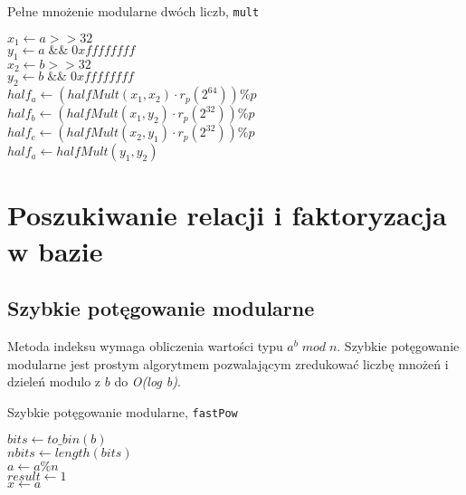 \documentclass[]{article}
\begin{document}
	\begin{algorithm}[H]
		\SetAlgoLined
		\caption{Pełne mnożenie modularne dwóch liczb, \texttt{mult}}
		\label{mult}
		\(x_1 \gets a >> 32\)\\
		\(y_1 \gets a \; \&\& \; 0xffffffff \) \\
		\(x_2 \gets b >> 32\)\\
		\(y_2 \gets b \; \&\& \; 0xffffffff \) \\
		\(half_a \gets (halfMult(x_1, x_2) \cdot r_p(2^{64})) \% p\) \\
		\(half_b \gets (halfMult(x_1, y_2) \cdot r_p(2^{32})) \% p\) \\
		\(half_c \gets (halfMult(x_2, y_1) \cdot r_p(2^{32})) \% p\) \\
		\(half_a \gets halfMult(y_1, y_2)\) \\
	\end{algorithm}
	
\newpage
\section{Poszukiwanie relacji i faktoryzacja w bazie}
	\subsection{Szybkie potęgowanie modularne}
	Metoda indeksu wymaga obliczenia wartości typu $a^{b}\;{mod}\;n$.
	Szybkie potęgowanie modularne jest prostym algorytmem pozwalającym zredukować liczbę mnożeń i dzieleń modulo z $b$ do \textit{O(log b)}.
	\newline
	\begin{algorithm}[H]
		\caption{Szybkie potęgowanie modularne,  \texttt{fastPow}} 
		\label{szybkie_pot} 
		\BlankLine
		$bits \gets to\_bin(b)$\\
		$nbits \gets length(bits)$\\
		$a \gets a\%n$\\
		$result \gets 1$\\
		$x \gets a$\\
	\end{algorithm}
	
\end{document}
